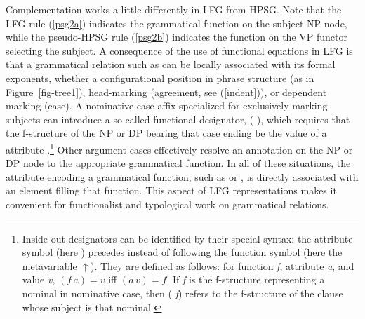 Complementation works a little differently in LFG from HPSG.  Note that the LFG  rule (\ref{psg2a}) indicates the  grammatical function on the subject NP node, while the pseudo-HPSG rule (\ref{psg2b}) indicates the  function on the VP functor selecting the subject.   A consequence of the use of functional equations in LFG is that a grammatical relation such as  can be locally associated with its formal exponents, whether a configurational position in phrase structure (as in Figure~\ref{fig-tree1}), head-marking (agreement, see (\ref{indent})), or dependent marking (case).  A nominative case affix specialized for exclusively marking subjects can introduce a so-called  functional designator, ( \Up),
 which requires that the f-structure of the NP or DP bearing that case ending be the value of a  attribute \citep{Nordlinger98a-u}.\footnote{Inside-out designators can be identified by their special syntax: the attribute symbol (here ) precedes instead of following the function symbol (here the metavariable $\uparrow$).  
They are defined as follows:  for function \textit{f}, attribute \textit{a}, and value \textit{v}, $(f \, a) = v$ iff $(a \, v) = f$. If \textit{f} is the f-structure representing a nominal in nominative case, then ( \textit{f}) refers to the f-structure of the clause whose subject is that nominal.}  Other argument cases effectively resolve an annotation on the NP or DP node to the appropriate grammatical function.  In all of these situations, the attribute encoding a grammatical function, such as  or , is directly associated with an element filling that function.  This aspect of LFG representations makes it convenient for functionalist and typological work on grammatical relations.  


 
